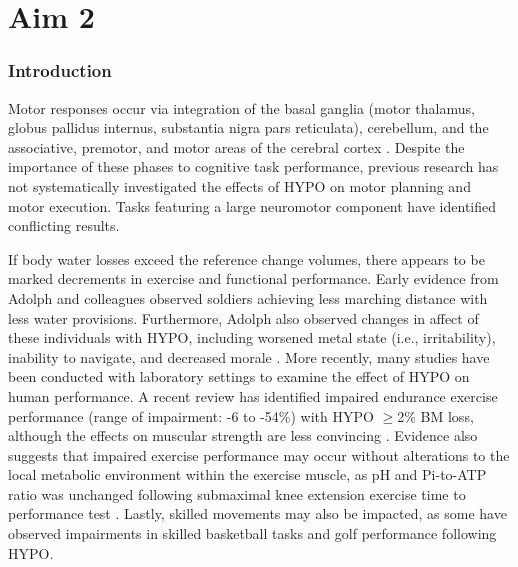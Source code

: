 \chapter{Aim 2}

\subsection{Introduction}


 Motor responses occur via integration of the basal ganglia (motor thalamus, globus pallidus internus, substantia nigra pars reticulata), cerebellum, and the associative, premotor, and motor areas of the cerebral cortex \cite{rizzolatti_organization_1998,bosch-bouju_motor_2013}. Despite the importance of these phases to cognitive task performance, previous research has not systematically investigated the effects of HYPO on motor planning and motor execution. Tasks featuring a large neuromotor component have identified conflicting results.
 
 
 
 
If body water losses exceed the reference change volumes, there appears to be marked decrements in exercise and functional performance. Early evidence from Adolph and colleagues \cite{adolf_physiology_1947} observed soldiers achieving less marching distance with less water provisions. Furthermore, Adolph also observed changes in affect of these individuals with HYPO, including worsened metal state (i.e., irritability), inability to navigate, and decreased morale \cite{adolf_physiology_1947}. More recently, many studies have been conducted with laboratory settings to examine the effect of HYPO on human performance. A recent review has identified impaired endurance exercise performance (range of impairment: -6 to -54\%) with HYPO ${\ge}$2\% BM loss, although the effects on muscular strength are less convincing \cite{sawka_hypohydration_2015,savoie_effect_2015}. Evidence also suggests that impaired exercise performance may occur without alterations to the local metabolic environment within the exercise muscle, as pH and Pi-to-ATP ratio was unchanged following submaximal knee extension exercise time to performance test \cite{montain_hypohydration_1998}. Lastly, skilled movements may also be impacted, as some have observed impairments in skilled basketball tasks \cite{baker_progressive_2007} and golf performance \cite{smith_effect_2012} following HYPO. 

